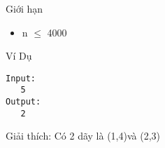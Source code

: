 Giới hạn
\begin{itemize}
	\item n $\le$ 4000
\end{itemize}
Ví Dụ
\begin{verbatim}
Input:
   5
Output:
   2
\end{verbatim}

Giải thích: Có 2 dãy là (1,4)và (2,3)